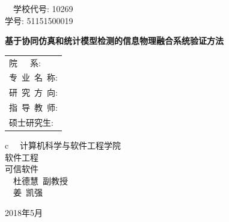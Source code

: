 \pagestyle{empty}

\hskip 4.75cm {{ ~~学校代号: {\large 10269}}}\\
\hspace*{\fill} {{ 学号: {\large 51151500019}}}

\vskip 2cm

\begin{center}
\end{center}

\vskip 3cm

\begin{center}
{\bf 基于协同仿真和统计模型检测的信息物理融合系统验证方法}
\end{center}

\vskip 3cm {\Large
\begin{center}
\begin{tabular}{l}
院\qquad\ \ \ 系:\\
专~业~名~称:\\
研~究~方~向:\\
指~导~教~师:\\
硕士研究生:
\end{tabular}
\begin{tabular}c
~~计算机科学与软件工程学院 \\
\hline  软件工程 \\
\hline  可信软件  \\
\hline ~~杜德慧\  副教授  \\
\hline ~~姜\ 凯强\   \\
\hline
\end{tabular}
\end{center}}

\vskip 30mm

\begin{center}
{\Large 2018年5月}
\end{center}
